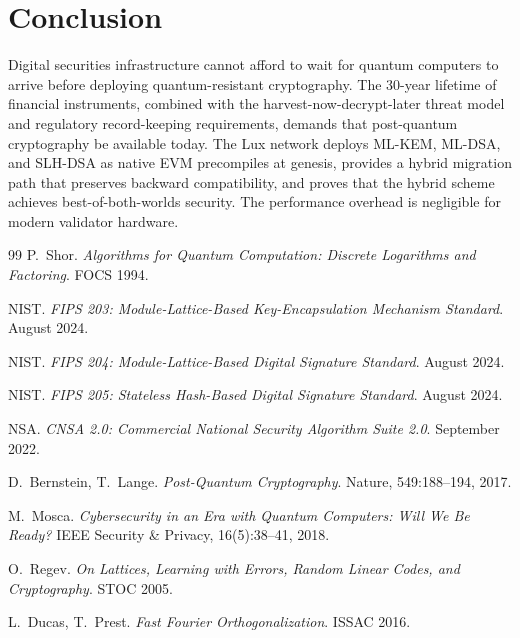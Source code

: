 \documentclass[11pt,a4paper]{article}
\begin{document}
\section{Conclusion}
\label{sec:conclusion}

Digital securities infrastructure cannot afford to wait for quantum
computers to arrive before deploying quantum-resistant cryptography.
The 30-year lifetime of financial instruments, combined with the
harvest-now-decrypt-later threat model and regulatory record-keeping
requirements, demands that post-quantum cryptography be available today.
The Lux network deploys ML-KEM, ML-DSA, and SLH-DSA as native EVM
precompiles at genesis, provides a hybrid migration path that preserves
backward compatibility, and proves that the hybrid scheme achieves
best-of-both-worlds security.  The performance overhead is negligible
for modern validator hardware.

\begin{thebibliography}{99}
P.~Shor.
\emph{Algorithms for Quantum Computation: Discrete Logarithms and
Factoring}.
FOCS 1994.

NIST.
\emph{FIPS 203: Module-Lattice-Based Key-Encapsulation Mechanism
Standard}.
August 2024.

NIST.
\emph{FIPS 204: Module-Lattice-Based Digital Signature Standard}.
August 2024.

NIST.
\emph{FIPS 205: Stateless Hash-Based Digital Signature Standard}.
August 2024.

NSA.
\emph{CNSA 2.0: Commercial National Security Algorithm Suite 2.0}.
September 2022.

D.~Bernstein, T.~Lange.
\emph{Post-Quantum Cryptography}.
Nature, 549:188--194, 2017.

M.~Mosca.
\emph{Cybersecurity in an Era with Quantum Computers: Will We Be Ready?}
IEEE Security \& Privacy, 16(5):38--41, 2018.

O.~Regev.
\emph{On Lattices, Learning with Errors, Random Linear Codes, and
Cryptography}.
STOC 2005.

L.~Ducas, T.~Prest.
\emph{Fast Fourier Orthogonalization}.
ISSAC 2016.
\end{thebibliography}
\end{document}
